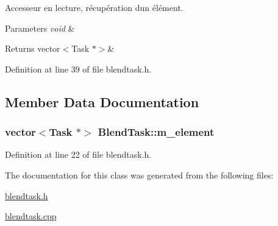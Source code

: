 Accesseur en lecture, récupération d\textquotesingle{}un élément. 


\begin{DoxyParams}{Parameters}
{\em void} & \\
\hline
\end{DoxyParams}
\begin{DoxyReturn}{Returns}
vector$<$\+Task $\ast$$>$\& 
\end{DoxyReturn}


Definition at line 39 of file blendtask.\+h.



\subsection{Member Data Documentation}
\hypertarget{class_blend_task_abc2ad39e5a8315432427ced2e87c8157}{}
\subsubsection[{m\+\_\+element}]{\setlength{\rightskip}{0pt plus 5cm}vector$<${\bf Task} $\ast$$>$ Blend\+Task\+::m\+\_\+element\hspace{0.3cm}{\ttfamily [protected]}}\label{class_blend_task_abc2ad39e5a8315432427ced2e87c8157}


Definition at line 22 of file blendtask.\+h.



The documentation for this class was generated from the following files\+:\begin{DoxyCompactItemize}
\item 
\hyperlink{blendtask_8h}{blendtask.\+h}\item 
\hyperlink{blendtask_8cpp}{blendtask.\+cpp}\end{DoxyCompactItemize}
